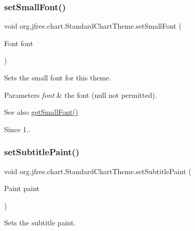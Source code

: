 \subsubsection{\texorpdfstring{set\+Small\+Font()}{setSmallFont()}}
{\footnotesize\ttfamily void org.\+jfree.\+chart.\+Standard\+Chart\+Theme.\+set\+Small\+Font (\begin{DoxyParamCaption}\item[{Font}]{font }\end{DoxyParamCaption})}

Sets the small font for this theme.


\begin{DoxyParams}{Parameters}
{\em font} & the font ({\ttfamily null} not permitted).\\
\hline
\end{DoxyParams}
\begin{DoxySeeAlso}{See also}
\mbox{\hyperlink{classorg_1_1jfree_1_1chart_1_1_standard_chart_theme_a118c992e7711e55b0e878892ff7e73e9}{get\+Small\+Font()}}
\end{DoxySeeAlso}
\begin{DoxySince}{Since}
1.. 
\end{DoxySince}
\mbox{\label{classorg_1_1jfree_1_1chart_1_1_standard_chart_theme_afd19c18a9662dbcea79896ccea56bc74}} 
\subsubsection{\texorpdfstring{set\+Subtitle\+Paint()}{setSubtitlePaint()}}
{\footnotesize\ttfamily void org.\+jfree.\+chart.\+Standard\+Chart\+Theme.\+set\+Subtitle\+Paint (\begin{DoxyParamCaption}\item[{Paint}]{paint }\end{DoxyParamCaption})}

Sets the subtitle paint.


